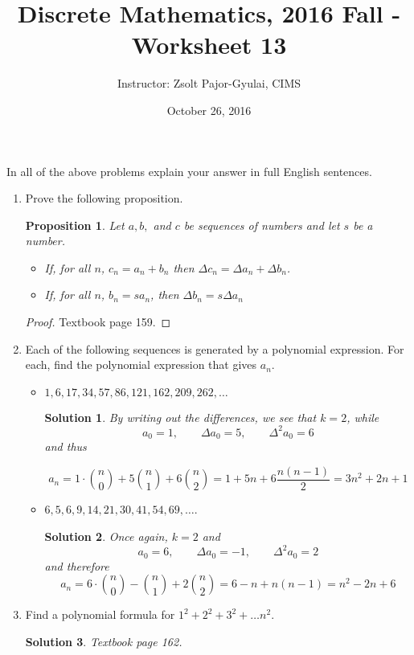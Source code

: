 \documentclass[11pt]{preprint}
\title{Discrete Mathematics, 2016 Fall - Worksheet 13}
\author{Instructor: Zsolt Pajor-Gyulai, CIMS}
\date{October 26, 2016}
\def\enumb{\begin{enumerate}}
\def\enume{\end{enumerate}}
\newtheorem{proposition}{Proposition}
\newtheorem*{solution}{Solution}
\begin{document}
\maketitle

In all of the above problems explain your answer in full English sentences.
\enumb

\item Prove the following proposition.

\begin{proposition}
Let $a,b,$ and $c$ be sequences of numbers and let $s$ be a number.
\begin{itemize}
\item If, for all $n$, $c_n=a_n+b_n$ then $\Delta c_n=\Delta a_n+\Delta b_n$.
\item If, for all $n$, $b_n=sa_n$, then $\Delta b_n=s\Delta a_n$
\end{itemize}
\end{proposition}

\begin{proof}
Textbook page 159.
\end{proof}

\item Each of the following sequences is generated by a polynomial expression. For each, find the polynomial expression that gives $a_n$.
\begin{itemize}
\item $1,6,17,34,57,86,121,162,209,262,\dots$
\begin{solution}
By writing out the differences, we see that $k=2$, while
\[
a_0=1, \qquad \Delta a_0=5,\qquad \Delta^2a_0=6
\]
and thus

\[
a_n=1\cdot\binom{n}{0}+5\binom{n}{1}+6\binom{n}{2}=1+5n+6\frac{n(n-1)}{2}=3n^2+2n+1
\]
\end{solution}
\item $6,5,6,9,14,21,30,41,54,69,\dots$.
\begin{solution}
Once again, $k=2$ and 
\[
a_0=6,\qquad \Delta a_0=-1,\qquad \Delta^2a_0=2
\]
and therefore
\[
a_n=6\cdot\binom{n}{0}-\binom{n}{1}+2\binom{n}{2}=6-n+n(n-1)=n^2-2n+6
\]
\end{solution}
\end{itemize}

\item Find a polynomial formula for $1^2+2^2+3^2+\dots n^2$.

\begin{solution}
Textbook page 162.
\end{solution}
\enume
\end{document}

